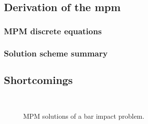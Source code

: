 \subsection{Derivation of the mpm}
\subsubsection{MPM discrete equations}
\subsubsection{Solution scheme summary}
\subsection{Shortcomings}
\begin{figure}[h!]
  \centering
  {  \label{subfig:mpm_diffusion_20}}
  {  \label{subfig:mpm_diffusion_50}}\\
  {  \label{subfig:mpm_energies}}
  \caption{MPM solutions of a bar impact problem.}
  \label{fig:mpm_diffusion}
\end{figure}

